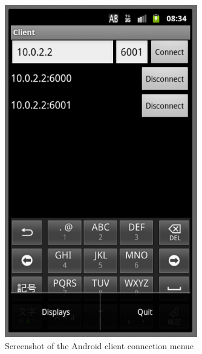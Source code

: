 \documentclass[8pt,titlepage]{article}
\begin{document}
\begin{figure}[hbp]
\includegraphics[width=0.75\textwidth]{../screenshots/androidConnecting.png}
\caption{Screenshot of the Android client connection menue}
\end{figure}
\end{document}
